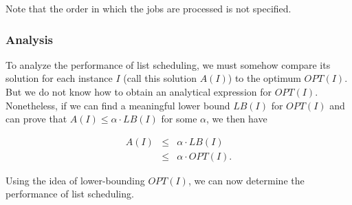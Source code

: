 \documentclass{article}
\begin{document}
Note that the order in which the jobs are processed is not specified.

\subsubsection{Analysis}

To analyze the performance of list scheduling, we must somehow compare its solution for each
instance $I$ (call this solution $A(I)$) to the optimum $OPT(I)$. But we do not know how to obtain
an analytical expression for $OPT(I)$. Nonetheless, if we can find a meaningful lower bound
$LB(I)$ for $OPT(I)$ and can prove that $A(I) \le \alpha \cdot LB(I)$ for some $\alpha$, we then
have

$$
\begin{array}{lcl}
A(I)    & \le & \alpha \cdot LB(I) \\
        & \le & \alpha \cdot OPT(I).
\end{array}
$$

Using the idea of lower-bounding $OPT(I)$, we can now determine the performance of list
scheduling.

{}
\end{document}
